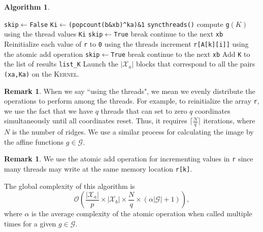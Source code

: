 \documentclass[11pt]{amsart}
\theoremstyle{plain}
\numberwithin{equation}{section}
\theoremstyle{definition}
\newtheorem{remark}[theorem]{Remark}
\newtheorem{algorithm}[theorem]{Algorithm}
\newcommand{\cX}{\mathcal{X}}
\newcommand{\cG}{\mathcal{G}}
\newcommand{\cO}{\mathcal{O}}
\begin{document}
\begin{algorithm}
\begin{algorithmic}[1]
		\State \texttt{skip}$\gets$\texttt{False}
		\State \texttt{Ki}$\gets$\texttt{(popcount(b\&{}xb)\^{}ka)\&{}1}
		\State \texttt{syncthreads()}
		\State compute \texttt{g}$(K)$ using the thread values \texttt{Ki}
		\State \texttt{skip}$\gets$\texttt{True}
		\State break
		\EndIf
		\EndFor
		\State continue to the next \texttt{xb}
		\EndIf
		\State Reinitialize each value of \texttt{r} to \texttt{0} using the threads
		\State increment \texttt{r[A[k][i]]} using the atomic add operation
		\State \texttt{skip}$\gets$\texttt{True}
		\State break
		\EndIf
		\EndFor
		\EndIf
		\State continue to the next \texttt{xb}
		\EndIf
		\State Add \texttt{K} to the list of results \texttt{list\_K}					
		\EndFor
		\EndFunction
		\State Launch the $|\cX_a|$ blocks that correspond to all the pairs \texttt{(xa,Ka)} on the \textsc{Kernel}.
		\EndProcedure	
	\end{algorithmic}

\end{algorithm}

\begin{remark} When we say ``using the threads", we mean we evenly distribute the operations to perform among the threads.
	For example, to reinitialize the array \texttt{r}, we use the fact that we have $q$ threads that can set to zero $q$ coordinates simultaneously until all coordinates reset.
	Thus, it requires $\lceil \frac{N}{q}\rceil$ iterations, where $N$ is the number of ridges.
	We use a similar process for calculating the image by the affine functions $g\in\cG$.
\end{remark}

\begin{remark}
	We use the atomic add operation for incrementing values in \texttt{r} since many threads may write at the same memory location \texttt{r[k]}.
\end{remark}

The global complexity of this algorithm is
$$
    \cO\left(\frac{|\cX_a|}{p}\times|\cX_b|\times \frac{N}{q}\times(\alpha|\cG|+1)\right),
$$
where $\alpha$ is the average complexity of the atomic operation when called multiple times for a given $g\in\cG$.
\end{document}
